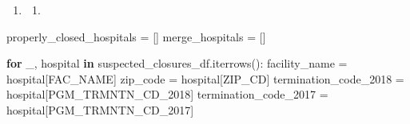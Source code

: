 \documentclass[
  letterpaper,
  DIV=11,
  numbers=noendperiod]{scrartcl}
\newenvironment{Shaded}{\begin{snugshade}}{\end{snugshade}}
\newcommand{\ControlFlowTok}[1]{\textcolor[rgb]{0.00,0.23,0.31}{\textbf{#1}}}
\newcommand{\KeywordTok}[1]{\textcolor[rgb]{0.00,0.23,0.31}{\textbf{#1}}}
\newcommand{\NormalTok}[1]{\textcolor[rgb]{0.00,0.23,0.31}{#1}}
\newcommand{\OperatorTok}[1]{\textcolor[rgb]{0.37,0.37,0.37}{#1}}
\newcommand{\StringTok}[1]{\textcolor[rgb]{0.13,0.47,0.30}{#1}}
\providecommand{\tightlist}{%
  \setlength{\itemsep}{0pt}\setlength{\parskip}{0pt}}\usepackage{longtable,booktabs,array}
\begin{document}
\begin{enumerate}
\def\labelenumi{\arabic{enumi}.}
\setcounter{enumi}{2}
\tightlist
\item
  \begin{enumerate}
  \def\labelenumii{\alph{enumii}.}
  \tightlist
  \item
  \end{enumerate}
\end{enumerate}

\begin{Shaded}
\begin{Highlighting}[]
\NormalTok{properly\_closed\_hospitals }\OperatorTok{=}\NormalTok{ []}
\NormalTok{merge\_hospitals }\OperatorTok{=}\NormalTok{ []}

\ControlFlowTok{for}\NormalTok{ \_, hospital }\KeywordTok{in}\NormalTok{ suspected\_closures\_df.iterrows():}
\NormalTok{    facility\_name }\OperatorTok{=}\NormalTok{ hospital[}\StringTok{\textquotesingle{}FAC\_NAME\textquotesingle{}}\NormalTok{]}
\NormalTok{    zip\_code }\OperatorTok{=}\NormalTok{ hospital[}\StringTok{\textquotesingle{}ZIP\_CD\textquotesingle{}}\NormalTok{]}
\NormalTok{    termination\_code\_2018 }\OperatorTok{=}\NormalTok{ hospital[}\StringTok{\textquotesingle{}PGM\_TRMNTN\_CD\_2018\textquotesingle{}}\NormalTok{]}
\NormalTok{    termination\_code\_2017 }\OperatorTok{=}\NormalTok{ hospital[}\StringTok{\textquotesingle{}PGM\_TRMNTN\_CD\_2017\textquotesingle{}}\NormalTok{]}
    

\end{Highlighting}
\end{Shaded}
\end{document}
